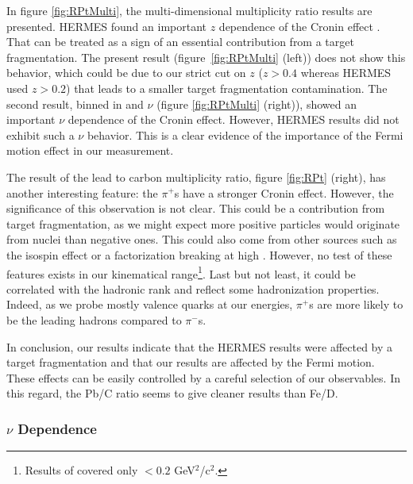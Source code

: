 In figure \ref{fig:RPtMulti}, the multi-dimensional multiplicity ratio results are presented. HERMES found an important $z$ dependence of the Cronin effect \cite{Airapetian:2007vu,Airapetian:2011jp}. That can be treated as a sign of an essential contribution from a target fragmentation. The present result 
(figure~\ref{fig:RPtMulti} (left)) does not show this behavior, which could be due to our strict cut on $z$ ($z>0.4$ whereas HERMES used $z>0.2$) that leads to a smaller target fragmentation contamination. The second result, binned in \pt and $\nu$ (figure \ref{fig:RPtMulti} (right)), showed an important 
$\nu$ dependence of the Cronin effect. However, HERMES results did not exhibit such a $\nu$ behavior. This is a clear evidence of the importance of 
the Fermi motion effect in our measurement.

The result of the lead to carbon multiplicity ratio, figure \ref{fig:RPt} 
(right), has another interesting feature: the $\pi^+$s have a stronger Cronin 
effect. However, the significance of this observation is not clear. This could be 
a contribution from target fragmentation, as we might expect more positive 
particles would originate from nuclei than negative ones. This could also come from other sources such as the isospin effect or a factorization breaking at high 
\ptp. However, no test of these features exists in our kinematical range\footnote{Results of \cite{Asaturyan:2011mq} covered only \pt$<0.2$ GeV$^2$/c$^2$.}. Last but not least, it could be correlated with the hadronic rank and reflect some hadronization properties. Indeed, as we probe mostly valence quarks at our energies, $\pi^+$s are more likely to be the leading hadrons compared to $\pi^-$s.

In conclusion, our results indicate that the HERMES results were affected by a target fragmentation and that our results are affected by the Fermi motion. These effects can be easily controlled by a careful selection of our observables. In this regard, the Pb/C ratio seems to give cleaner results than Fe/D.

\subsubsection{$\nu$ Dependence}

